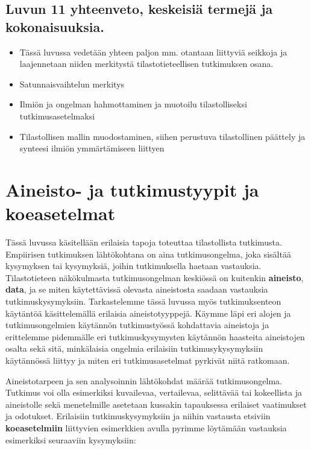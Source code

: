 \documentclass[
]{book}
\providecommand{\tightlist}{%
  \setlength{\itemsep}{0pt}\setlength{\parskip}{0pt}}
\begin{document}
\hypertarget{luvun-11-yhteenveto-keskeisiuxe4-termejuxe4-ja-kokonaisuuksia.}{%
\section{Luvun 11 yhteenveto, keskeisiä termejä ja kokonaisuuksia.}\label{luvun-11-yhteenveto-keskeisiuxe4-termejuxe4-ja-kokonaisuuksia.}}

\begin{itemize}
\tightlist
\item
  Tässä luvussa vedetään yhteen paljon mm. otantaan liittyviä seikkoja ja laajennetaan niiden merkitystä tilastotieteellisen tutkimuksen osana.
\item
  Satunnaisvaihtelun merkitys
\item
  Ilmiön ja ongelman hahmottaminen ja muotoilu tilastolliseksi tutkimusasetelmaksi
\item
  Tilastollisen mallin muodostaminen, siihen perustuva tilastollinen päättely ja synteesi ilmiön ymmärtämiseen liittyen
\end{itemize}

\hypertarget{luku12}{%
\chapter{Aineisto- ja tutkimustyypit ja koeasetelmat}\label{luku12}}

Tässä luvussa käsitellään erilaisia tapoja toteuttaa tilastollista tutkimusta. Empiirisen tutkimuksen lähtökohtana on aina tutkimusongelma, joka sisältää kysymyksen tai kysymyksiä, joihin tutkimuksella haetaan vastauksia. Tilastotieteen näkökulmasta tutkimusongelman keskiössä on kuitenkin \textbf{aineisto}, \textbf{data}, ja se miten käytettävissä olevasta aineistosta saadaan vastauksia tutkimuskysymyksiin. Tarkastelemme tässä luvussa myös tutkimuksenteon käytäntöä käsittelemällä erilaisia aineistotyyppejä. Käymme läpi eri alojen ja tutkimusongelmien käytännön tutkimustyössä kohdattavia aineistoja ja erittelemme pidemmälle eri tutkimuskysymysten käytännön haasteita aineistojen osalta sekä sitä, minkälaisia ongelmia erilaisiin tutkimusykysymyksiin käytännössä liittyy ja miten eri tutkimusasetelmat pyrkivät niitä ratkomaan.

Aineistotarpeen ja sen analysoinnin lähtökohdat määrää tutkimusongelma. Tutkimus voi olla esimerkiksi kuvailevaa, vertailevaa, selittävää tai kokeellista ja aineistolle sekä menetelmille asetetaan kussakin tapauksessa erilaiset vaatimukset ja odotukset. Erilaisiin tutkimuskysymyksiin ja niihin vastausta etsiviin \textbf{koeasetelmiin} liittyvien esimerkkien avulla pyrimme löytämään vastauksia esimerkiksi seuraaviin kysymyksiin:
\end{document}
